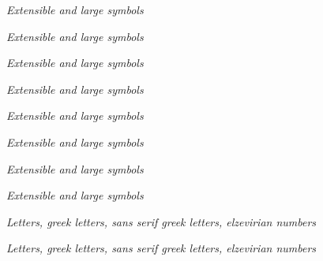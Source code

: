 \documentclass[12pt,a4paper]{article}
\begin{document}
{
\bigskip
\begin{center}
\textit{Extensible and large symbols}
\end{center}
\vfill\clearpage

\bigskip
\begin{center}
\textit{Extensible and large symbols}
\end{center}
\vfill\clearpage

\bigskip
\begin{center}
\textit{Extensible and large symbols}
\end{center}
\vfill\clearpage

\bigskip
\begin{center}
\textit{Extensible and large symbols}
\end{center}
\vfill\clearpage

\bigskip
\begin{center}
\textit{Extensible and large symbols}
\end{center}
\vfill\clearpage

\bigskip
\begin{center}
\textit{Extensible and large symbols}
\end{center}
\vfill\clearpage

\bigskip
\begin{center}
\textit{Extensible and large symbols}
\end{center}
\vfill\clearpage

\bigskip
\begin{center}
\textit{Extensible and large symbols}
\end{center}
\vfill\clearpage

}
  


\bigskip
\begin{center}
\textit{Letters, greek letters, sans serif greek letters, elzevirian numbers}
\end{center}
\vfill\clearpage

\bigskip
\begin{center}
\textit{Letters, greek letters, sans serif greek letters, elzevirian numbers}
\end{center}
\vfill\clearpage
\end{document}
